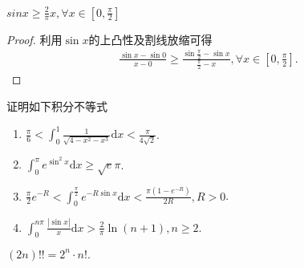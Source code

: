 \documentclass[../../main.tex]{subfiles}
\begin{document}
\begin{theorem}[Jordan不等式]\label{theorem:Jordan不等式}
$sinx\geqslant \frac{2}{\pi}x,\forall x\in [0,\frac{\pi}{2}]$
\end{theorem}
\begin{proof}
利用$\sin x$的上凸性及割线放缩可得
\begin{align*}
\frac{\sin x-\sin 0}{x-0}\geqslant \frac{\sin \frac{\pi}{2}-\sin x}{\frac{\pi}{2}-x},\forall x\in \left[ 0,\frac{\pi}{2} \right] .
\end{align*}

\end{proof}

\begin{example}
证明如下积分不等式
\begin{enumerate}
\item \(\frac{\pi}{6} < \int_{0}^{1}\frac{1}{\sqrt{4 - x^{2}-x^{3}}}\mathrm{d}x < \frac{\pi}{4\sqrt{2}}\).

\item \(\int_{0}^{\pi}e^{\sin^{2}x}\mathrm{d}x \geqslant \sqrt{e}\pi\).

\item \(\frac{\pi}{2}e^{-R} < \int_{0}^{\frac{\pi}{2}}e^{-R\sin x}\mathrm{d}x < \frac{\pi(1 - e^{-R})}{2R}, R > 0\).

\item $\int_0^{n\pi}{\frac{\left| \sin x \right|}{x}\mathrm{d}x}>\frac{2}{\pi}\ln \left( n+1 \right) ,n\geqslant 2.$
\end{enumerate}
\end{example}
\begin{remark}
$(2n)!!=2^n\cdot n!.$
\end{remark}
\end{document}
